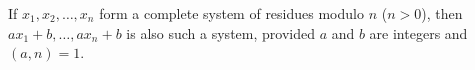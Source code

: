 If $x_1,x_2,\ldots,x_n$ form a complete system of residues modulo $n$ ($n>0$), then $ax_1+b,\ldots,ax_n+b$ is also such a system, provided $a$ and $b$ are integers and $(a,n)=1$.
